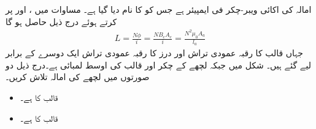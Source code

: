 امالہ کی اکائی ویبر-چکر فی ایمپیئر ہے جس کو   کا نام دیا گیا ہے۔ مساوات  میں ،    اور  پر کرتے ہوئے درج ذیل حاصل ہو گا
\begin{align}
L=\frac{N \phi}{i}=\frac{N B_c A_c}{i}=\frac{N^2 \mu_0 A_a}{l_a}
\end{align}
جہاں قالب کا رقبہ عمودی تراش  اور درز کا رقبہ عمودی تراش  ایک دوسرے کے برابر لیے گئے ہیں۔
%
شکل  میں  جبکہ لچھے کے  چکر اور قالب کی اوسط لمبائی  ہے۔درج ذیل دو صورتوں میں لچھے کی امالہ تلاش کریں۔
\begin{itemize}
\item
قالب کا  ہے۔
\item
قالب کا  ہے۔
\end{itemize}
